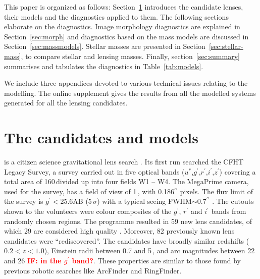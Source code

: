 This paper is organized as follows:
Section~\ref{sec:candidates_models} introduces the candidate lenses,
their models and the diagnostics applied to them.  The following
sections elaborate on the diagnostics.  Image morphology diagnostics
are explained in Section~\ref{sec:morph} and diagnostics based on the
mass models are discussed in Section~\ref{sec:massmodels}.  Stellar masses are
presented in Section~\ref{sec:stellar-mass}, to compare stellar and
lensing masses.  Finally, section~\ref{sec:summary}
summarises and tabulates the diagnostics in Table~\ref{tab:models}.

We include three appendices devoted to various technical issues
relating to the modelling.  The online supplement gives the results
from all the modelled systems generated for all the lensing
candidates.

\section{The candidates and models}
\label{sec:candidates_models}

\SW is a citizen science gravitational lens search
\citep{2016MNRAS.455.1171M}.  Its first run searched the CFHT Legacy
Survey, a survey carried out in five optical bands
($u^*$,$g^\prime$,$r^\prime$,$i^\prime$,$z^\prime$) covering a total
area of 160\,\sqdeg divided up into four fields W1 -- W4.  The
MegaPrime camera, used for the survey, has a field of view of
1\,\sqdeg, with 0.186$^{\prime\prime}$ pixels. The flux limit of the
survey is $g^\prime<$25.6AB (5\,$\sigma$) with a typical seeing
FWHM$\sim 0.7^{\prime\prime}$ \citep{2013MNRAS.433.2545E}. The cutouts
shown to the volunteers were colour composites of the $g^\prime$,
$r^\prime$ and $i^\prime$ bands from randomly chosen regions.
The programme resulted in 59 new lens candidates, of which 29 are
considered high quality \citep{2016MNRAS.455.1191M}.
Moreover, 82 previously known lens candidates were ``rediscovered''.
The candidates have broadly similar redshifts ($0.2<z<1.0$), Einstein
radii between 0.7 and 5\,\arcsec, and arc magnitudes between 22 and 26
\textcolor{red}{\bf IF: in the $g^\prime$ band?}. These properties are
similar to those found by previous robotic searches like ArcFinder and
RingFinder.


